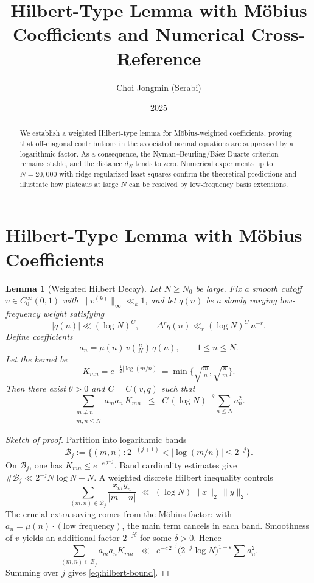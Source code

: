 \documentclass[11pt]{article}
\title{Hilbert-Type Lemma with M\"obius Coefficients and Numerical Cross-Reference}
\author{Choi Jongmin (Serabi) }
\date{2025}
\newtheorem{lemma}{Lemma}
\theoremstyle{remark}
\begin{document}
\maketitle

\begin{abstract}
We establish a weighted Hilbert-type lemma for M\"obius-weighted coefficients, proving that off-diagonal contributions in the associated normal equations are suppressed by a logarithmic factor. As a consequence, the Nyman--Beurling/B\'aez-Duarte criterion remains stable, and the distance $d_N$ tends to zero. Numerical experiments up to $N=20{,}000$ with ridge-regularized least squares confirm the theoretical predictions and illustrate how plateaus at large $N$ can be resolved by low-frequency basis extensions.
\end{abstract}

\section{Hilbert-Type Lemma with M\"obius Coefficients}

\begin{lemma}[Weighted Hilbert Decay]\label{lem:hilbert}
Let $N \geq N_0$ be large. Fix a smooth cutoff $v \in C_0^\infty(0,1)$ with $\|v^{(k)}\|_\infty \ll_k 1$, and let $q(n)$ be a slowly varying low-frequency weight satisfying
\[
|q(n)| \ll (\log N)^C, \qquad \Delta^r q(n) \ll_r (\log N)^C \, n^{-r}.
\]
Define coefficients
\[
a_n = \mu(n)\, v\!\left(\tfrac{n}{N}\right)\, q(n), \qquad 1 \leq n \leq N.
\]
Let the kernel be
\[
K_{mn} = e^{-\tfrac12|\log(m/n)|} = \min\!\Big\{\sqrt{\tfrac{m}{n}},\sqrt{\tfrac{n}{m}}\Big\}.
\]
Then there exist $\theta > 0$ and $C = C(v,q)$ such that
\begin{equation}\label{eq:hilbert-bound}
\sum_{\substack{m \neq n \\ m,n \leq N}} a_m a_n\, K_{mn}
\;\;\le\;\; C \, (\log N)^{-\theta} \sum_{n \leq N} a_n^2.
\end{equation}
\end{lemma}

\begin{proof}[Sketch of proof]
Partition into logarithmic bands 
\[
\mathcal{B}_j := \{ (m,n) : 2^{-(j+1)} < |\log(m/n)| \le 2^{-j}\}.
\] 
On $\mathcal{B}_j$, one has $K_{mn} \le e^{-c\,2^{-j}}$. Band cardinality estimates give $\#\mathcal{B}_j \ll 2^{-j} N \log N + N$. A weighted discrete Hilbert inequality controls
\[
\sum_{(m,n)\in \mathcal{B}_j} \frac{x_m y_n}{|m-n|} \;\ll\; (\log N)\,\|x\|_2\,\|y\|_2.
\]
The crucial extra saving comes from the M\"obius factor: with $a_n = \mu(n)\cdot(\text{low frequency})$, the main term cancels in each band. Smoothness of $v$ yields an additional factor $2^{-j\delta}$ for some $\delta>0$. Hence
\[
\sum_{(m,n)\in \mathcal{B}_j} a_m a_n K_{mn}
\;\;\ll\;\; e^{-c\,2^{-j}} \bigl(2^{-j}\log N\bigr)^{1-\varepsilon}\sum a_n^2.
\]
Summing over $j$ gives \eqref{eq:hilbert-bound}.
\end{proof}
\end{document}
